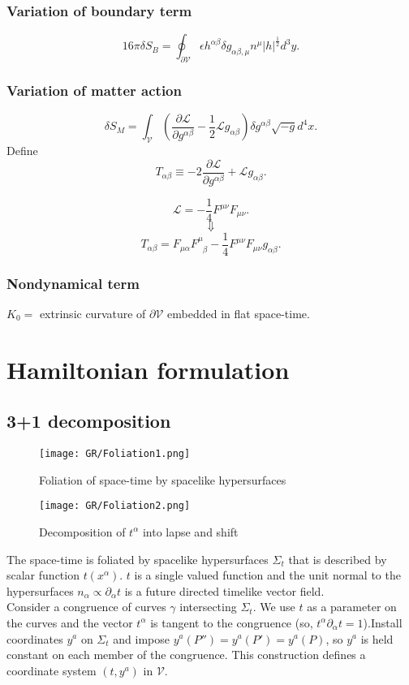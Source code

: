 \subsubsection{Variation of boundary term}
\[16\pi \delta S_B = \oint_{\partial \mathcal{V}} \epsilon h^{\alpha \beta} \delta g_{\alpha \beta, \mu} n^{\mu} |h|^{\frac{1}{2}} d^3 y .\]
\subsubsection{Variation of matter action}
\[\delta S_M = \int_{\mathcal{V}} \left( \frac{\partial \mathcal{L}}{\partial g^{\alpha \beta}} - \frac{1}{2} \mathcal{L} g_{\alpha \beta} \right) \delta g^{\alpha \beta} \sqrt{-g} d^4 x.\]
Define
\[T_{\alpha \beta} \equiv -2 \frac{\partial \mathcal{L}}{\partial g^{\alpha \beta}} + \mathcal{L} g_{\alpha \beta}.\]
\begin{example}
\[\mathcal{L} = -\frac{1}{4} F^{\mu \nu}F_{\mu \nu}.\]
\[\Downarrow\]
\[T_{\alpha \beta} = F_{\mu \alpha} F^{\mu}_{\phantom{\mu} \beta} - \frac{1}{4} F^{\mu \nu} F_{\mu \nu} g_{\alpha \beta}.\]
\end{example}
\subsubsection{Nondynamical term}
$K_0 = $ extrinsic curvature of $\partial \mathcal{V}$ embedded in flat space-time.

\section{Hamiltonian formulation}
\subsection{3+1 decomposition}
\begin{figure}[!h]
\begin{minipage}[t]{0.5\linewidth}
\centering
\texttt{[image: GR/Foliation1.png]}
\caption{Foliation of space-time by spacelike hypersurfaces}
\label{fig:side:a}
\end{minipage}%
\begin{minipage}[t]{0.5\linewidth}
\centering
\texttt{[image: GR/Foliation2.png]}
\caption{Decomposition of $t^{\alpha}$ into lapse and shift}
\label{fig:side:b}
\end{minipage}
\end{figure}
\noindent
The space-time is foliated by spacelike hypersurfaces $\Sigma_t$ that is described by scalar function $t(x^{\alpha})$. $t$ is a single valued function and the unit normal to the hypersurfaces $n_{\alpha} \propto \partial_{\alpha} t$ is a future directed timelike vector field.\\
Consider a congruence of curves $\gamma$ intersecting $\Sigma_t$. We use $t$ as a parameter on the curves and the vector $t^{\alpha}$ is tangent to the congruence (so, $t^{\alpha} \partial_{\alpha}t = 1$).Install coordinates $y^a$ on $\Sigma_t$ and impose $y^a(P'') = y^a(P') = y^a(P)$, so $y^a$ is held constant on each member of the congruence. This construction defines a coordinate system $(t,y^a)$ in $\mathcal{V}$.\\
